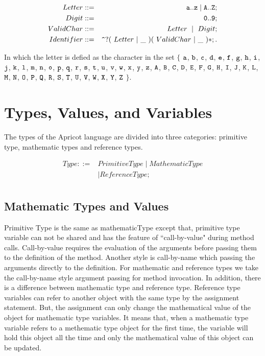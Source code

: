 \documentclass{WileySix}
\begin{document}
\begin{eqnarray*}
 Letter  &::=& {\tt a .. z \mid A .. Z} ;\\
 Digit  &::=& {\tt 0 .. 9};\\
 ValidChar  &::=&  Letter   ~\mid~  Digit ;\\
 Identifier  &::=& {\tt \verb!^!} ? (~Letter~|~{\tt \_}~) (~ValidChar~|~{\tt \_}~)*;.
\end{eqnarray*}


In which the letter is defied as the character in the set 
$\{$  ${\tt a}$, 
${\tt b}$, ${\tt c}$, ${\tt d}$, 
${\tt e}$, ${\tt f}$, ${\tt g}$, ${\tt h}$, 
${\tt i}$, ${\tt j}$, ${\tt k}$, ${\tt l}$, ${\tt m}$, 
${\tt n}$, ${\tt o}$, ${\tt p}$, ${\tt q}$, ${\tt r}$, 
${\tt s}$, ${\tt t}$, ${\tt u}$, ${\tt v}$, ${\tt w}$, 
${\tt x}$, ${\tt y}$, ${\tt z}$, ${\tt A}$, ${\tt B}$, 
${\tt C}$, ${\tt D}$, ${\tt E}$, ${\tt F}$, ${\tt G}$, 
${\tt H}$, ${\tt I}$, ${\tt J}$, ${\tt K}$, ${\tt L}$, 
${\tt M}$, ${\tt N}$, ${\tt O}$, ${\tt P}$, ${\tt Q}$, 
${\tt R}$, ${\tt S}$, ${\tt T}$, ${\tt U}$, ${\tt V}$, 
${\tt W}$, ${\tt X}$, ${\tt Y}$, ${\tt Z}$
$\}$.


\section{Types, Values, and Variables}
The types of the Apricot  language are divided into three categories: primitive type,
mathematic types and reference types. 

\begin{align*}
 Type ::= & PrimitiveType \mid MathematicType  \\
          & \mid  ReferenceType ;\\
\end{align*}



\subsection{Mathematic Types and Values}
Primitive Type is the same as mathematicType except that, primitive type variable 
can not be shared and has the feature of ``call-by-value" during method calls. 
Call-by-value requires the evaluation of the arguments before passing them to the definition of the method. Another style is call-by-name which passing the arguments directly to the definition.
For mathematic and reference types we take the call-by-name style argument passing for method invocation. In addition, there is a difference between mathematic type and reference type. Reference type variables can refer to another object with the same type by the assignment statement. But, the assignment can only change the mathematical value of the object for mathematic type variables. It means that, when a mathematic type variable refers to a methematic type object for the first time, the variable will hold this object all the time and only the mathematical value of this object can be updated.
\end{document}
